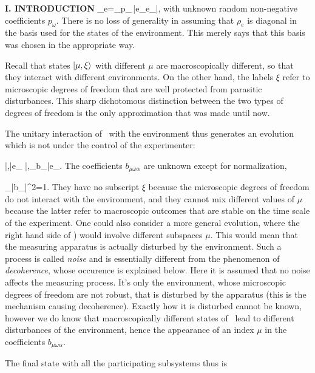\begin{center}{\bf I. INTRODUCTION}
\beq \rho_e=\sum_\omega p_\omega\,|e_\omega\9\6e_\omega|,
 \label{rhoenv} \eeq
with unknown random non-negative coefficients $p_\omega$. There is no
loss of generality in assuming that $\rho_e$ is diagonal in the basis
used for the states of the environment. This merely says that this basis
was chosen in the appropriate way.

Recall that states $|\mu,\xi\rangle$ with different $\mu$ are macroscopically
different, so that they interact with different environments. On the
other hand, the labels $\xi$ refer to micro\-scopic degrees of freedom
that are well protected from parasitic disturbances. This sharp
dichotomous distinction between the two types of degrees of freedom is
the only approximation that was made until now.

The unitary interaction of \cC\ with the environment thus generates an
evolution which is not under the control of the experimenter:

\beq |\mu,\xi\9\0|e_\omega\9\to
 |\mu,\xi\9\0\sum_\alpha b_{\mu\omega\alpha}|e_\alpha\9.
 \label{deco}\eeq
The coefficients $b_{\mu\omega\alpha}$ are unknown except for
normalization,

\beq \sum_\alpha |b_{\mu\omega\alpha}|^2=1. \label{bnorm}\eeq
They have no subscript $\xi$ because the microscopic degrees of freedom
do not interact with the environment, and they cannot mix different
values of $\mu$ because the latter refer to macroscopic outcomes that
are stable on the time scale of the experiment. One could also consider
a more general evolution, where the right hand side of ) would
involve different subspaces $\mu$. This would mean that the measuring
apparatus is actually disturbed by the environment. Such a process is
called {\it noise\/} and is essentially different from the phenomenon of
{\it decoherence\/}, whose occurence is explained below. Here it is
assumed that no noise affects the measuring process. It's only the
environment, whose microscopic degrees of freedom are not robust, that
is disturbed by the apparatus (this is the mechanism causing
decoherence). Exactly how it is disturbed cannot be known, however we do
know that macroscopically different states of \cC\ lead to different
disturbances of the environment, hence the appearance of an index $\mu$
in the coefficients $b_{\mu\omega\alpha}$.

The final state with all the participating subsystems thus is


\end{center}
